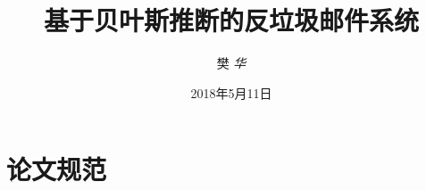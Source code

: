 \documentclass[bachelor]{ustcthesis}
\title{基于贝叶斯推断的反垃圾邮件系统}
\author{樊 \em 华}
\date{2018年5月11日}    %
\begin{document}
\maketitle

%

\frontmatter

\tableofcontents
% 

\mainmatter






\appendix
\chapter{论文规范}

\backmatter


\end{document}
